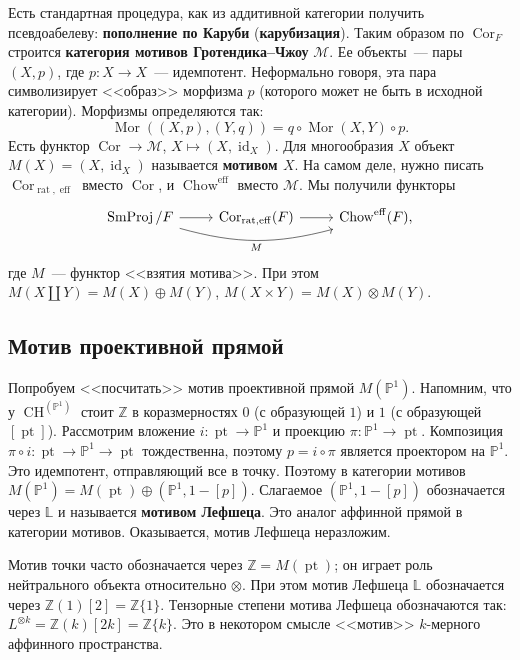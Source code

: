 \documentclass[a4paper]{article}
\DeclareMathOperator{\CH}{CH}
\DeclareMathOperator{\pt}{pt}
\DeclareMathOperator{\Cor}{Cor}
\DeclareMathOperator{\Mor}{Mor}
\DeclareMathOperator{\id}{id}
\newcommand{\term}{\textbf}
\theoremstyle{definition}
\begin{document}
Есть стандартная процедура, как из аддитивной категории получить
псевдоабелеву: \term{пополнение по Каруби} (\term{карубизация}).
Таким образом по $\Cor_F$ строится
\term{категория мотивов Гротендика--Чжоу} $\mathcal{M}$.
Ее объекты~--- пары $(X,p)$, где $p\colon X\to X$~--- идемпотент.
Неформально говоря, эта пара символизирует <<образ>> морфизма $p$
(которого может не быть в исходной категории).
Морфизмы определяются так:
\[
\Mor((X,p),(Y,q)) = q\circ\Mor(X,Y)\circ p.
\]
Есть функтор $\Cor\to\mathcal{M}$, $X\mapsto (X,\id_X)$.
Для многообразия $X$ объект $M(X) = (X,\id_X)$ называется
\term{мотивом $X$}.
На самом деле, нужно писать $\Cor_{\operatorname{rat},\operatorname{eff}}$
вместо $\Cor$, и $\operatorname{Chow}^{\operatorname{eff}}$ вместо
$\mathcal{M}$.
Мы получили функторы
\[
\begin{tikzcd}
\operatorname{SmProj}/F \arrow{r} \arrow[bend right=15, swap]{rr}{M}
& \Cor_{\operatorname{rat},\operatorname{eff}}(F) \arrow{r}
& \operatorname{Chow}^{\operatorname{eff}}(F),
\end{tikzcd}
\]
где $M$~--- функтор <<взятия мотива>>.
При этом $M(X\coprod Y) = M(X) \oplus M(Y)$,
$M(X\times Y) = M(X)\otimes M(Y)$.

\subsection{Мотив проективной прямой}

Попробуем <<посчитать>> мотив проективной прямой $M(\mathbb{P}^1)$.
Напомним, что у $\CH^(\mathbb{P}^1)$ стоит $\mathbb{Z}$ в коразмерностях
$0$ (с образующей $1$) и $1$ (с образующей $[\pt]$).
Рассмотрим вложение $i\colon \pt\to \mathbb{P}^1$
и проекцию $\pi\colon\mathbb{P}^1\to\pt$.
Композиция $\pi\circ i \colon \pt \to \mathbb{P}^1 \to \pt$
тождественна, поэтому $p = i\circ\pi$ является проектором на $\mathbb{P}^1$.
Это идемпотент, отправляющий все в точку.
Поэтому в категории мотивов
$M(\mathbb{P}^1) = M(\pt) \oplus (\mathbb{P}^1, 1 - [p])$.
Слагаемое $(\mathbb{P}^1, 1 - [p])$ обозначается через $\mathbb{L}$
и называется \term{мотивом Лефшеца}.
Это аналог аффинной прямой в категории мотивов.
Оказывается, мотив Лефшеца неразложим.

Мотив точки часто обозначается через $\mathbb Z = M(\pt)$;
он играет роль нейтрального объекта относительно $\otimes$.
При этом мотив Лефшеца $\mathbb{L}$ обозначается
через $\mathbb{Z}(1)[2] = \mathbb{Z}\{1\}$.
Тензорные степени мотива Лефшеца обозначаются так:
$L^{\otimes k} = \mathbb{Z}(k)[2k] = \mathbb{Z}\{k\}$.
Это в некотором смысле <<мотив>> $k$-мерного аффинного пространства.
\end{document}
